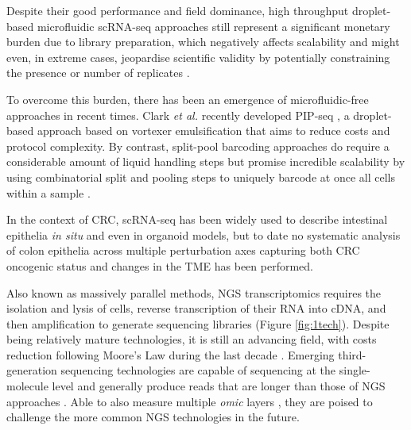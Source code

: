 Despite their good performance and field dominance, high throughput droplet-based microfluidic scRNA-seq approaches still represent a significant monetary burden due to library preparation, which negatively affects scalability and might even, in extreme cases, jeopardise scientific validity by potentially constraining the presence or number of replicates \cite{zimmerman_practical_2021}.

To overcome this burden, there has been an emergence of microfluidic-free approaches in recent times. Clark \textit{et al.} recently developed PIP-seq \cite{clark_microfluidics-free_2023}, a droplet-based approach based on vortexer emulsification that aims to reduce costs and protocol complexity. By contrast, split-pool barcoding approaches do require a considerable amount of liquid handling steps but promise incredible scalability by using combinatorial split and pooling steps to uniquely barcode at once all cells within a sample \cite{rosenberg_single-cell_2018}.

In the context of CRC, scRNA-seq has been widely used to describe intestinal epithelia \emph{in situ} \cite{haber_single-cell_2017} and even in organoid models, but to date no systematic analysis of colon epithelia across multiple perturbation axes capturing both CRC oncogenic status and changes in the TME has been performed. 

Also known as massively parallel methods, NGS transcriptomics requires the isolation and lysis of cells, reverse transcription of their RNA into cDNA, and then amplification to generate sequencing libraries (Figure \ref{fig:1tech}). Despite being relatively mature technologies, it is still an advancing field, with costs reduction following Moore's Law during the last decade \cite{wetterstrand_dna_2022}.
Emerging third-generation sequencing technologies \cite{check_hayden_genome_2009} are capable of sequencing at the single-molecule level and generally produce reads that are longer than those of NGS approaches \cite{eid_real-time_2009,deamer_three_2016}. Able to also measure multiple \emph{omic} layers \cite{ni_deepsignal_2019}, they are poised to challenge the more common NGS technologies in the future.


